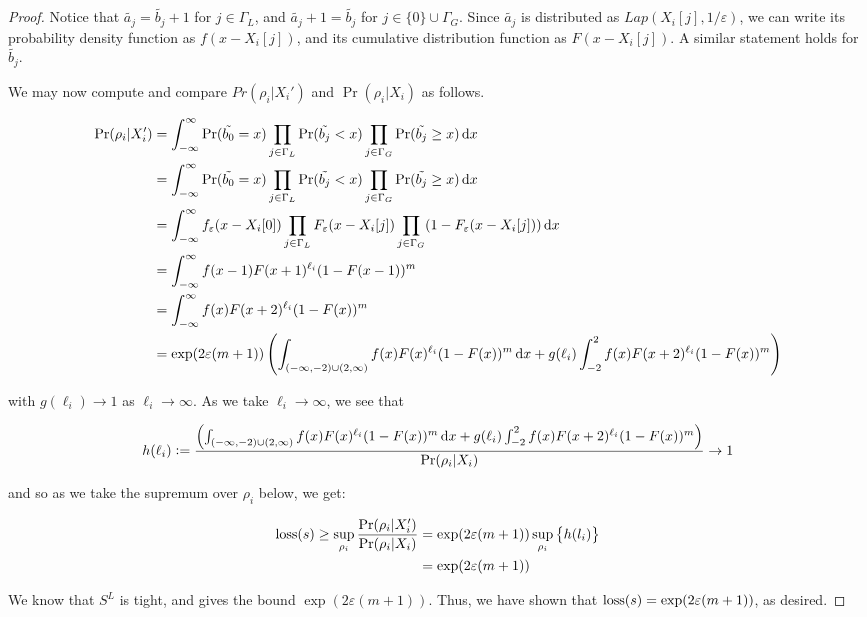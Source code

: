 \documentclass{article}
\renewcommand{\epsilon}{\varepsilon}
\newcommand{\loss}{\textup{loss}}
\newcommand{\1}{\langle 1 \rangle}
\newcommand{\2}{\langle 2 \rangle}
\begin{document}
\begin{proof}
    Notice that $\tilde{a_j} = \tilde{b_j} + 1$ for $j \in \Gamma_L$, and $\tilde{a_j} + 1 = \tilde{b_j}$ for $j \in \{0\} \cup \Gamma_G$. Since $\tilde{a_j}$ is distributed as $Lap(X_i[j], 1/\epsilon)$, we can write its probability density function as $f(x - X_i[j])$, and its cumulative distribution function as $F(x - X_i[j])$. A similar statement holds for $\tilde{b_j}$.
    
    We may now compute and compare $Pr(\rho_i | X_i')$ and $\Pr(\rho_i | X_i)$ as follows.

    \begin{align*}
        \Pr(\rho_i | X_i') &= \int_{-\infty}^\infty \Pr(\tilde{b_0} = x) \prod_{j \in \Gamma_L} \Pr(\tilde{b_j} < x) \prod_{j \in \Gamma_G} \Pr(\tilde{b_j} \geq x) \dif x\\
        &= \int_{-\infty}^\infty \Pr(\tilde{b_0} = x) \prod_{j \in \Gamma_L} \Pr(\tilde{b_j} < x) \prod_{j \in \Gamma_G} \Pr(\tilde{b_j} \geq x) \dif x\\
        &= \int_{-\infty}^\infty f_\epsilon(x - X_i[0]) \prod_{j \in \Gamma_L} F_\epsilon(x - X_i[j]) \prod_{j \in \Gamma_G} (1 - F_\epsilon(x - X_i[j])) \dif x\\
        &= \int_{-\infty}^\infty f(x - 1) F(x + 1)^{\ell_i}  (1 - F(x - 1))^m \\
        &= \int_{-\infty}^\infty f(x) F(x + 2)^{\ell_i}  (1 - F(x))^m \\
        &= \exp(2\epsilon (m + 1) )\left(\int_{(-\infty, -2) \cup (2, \infty)} f(x) F(x)^{\ell_i}  (1 - F(x))^m \dif x + g(\ell_i) \int_{-2}^2 f(x) F(x + 2)^{\ell_i}  (1 - F(x))^m\right)
    \end{align*}

    with $g(\ell_i) \to 1$ as $\ell_i \to \infty$. As we take $\ell_i \to \infty$, we see that 

    \begin{align*}
        h(\ell_i) := \frac{\left(\int_{(-\infty, -2) \cup (2, \infty)} f(x) F(x)^{\ell_i}  (1 - F(x))^m \dif x + g(\ell_i) \int_{-2}^2 f(x) F(x + 2)^{\ell_i}  (1 - F(x))^m\right)}{\Pr(\rho_i | X_i)} \to 1
    \end{align*}

    and so as we take the supremum over $\rho_i$ below, we get: 

    \begin{align*}
        \loss(s) \geq \sup_{\rho_i} \frac{\Pr(\rho_i | X_i')}{\Pr(\rho_i | X_i)} &= \exp(2\epsilon(m + 1)) \sup_{\rho_i} \left\{ h(l_i) \right\}\\
        &= \exp(2\epsilon(m + 1))
    \end{align*}

    We know that $S^L$ is tight, and gives the bound $\exp(2\epsilon(m + 1))$. Thus, we have shown that $\loss(s) = \exp(2\epsilon(m + 1))$, as desired.
\end{proof}
\end{document}
